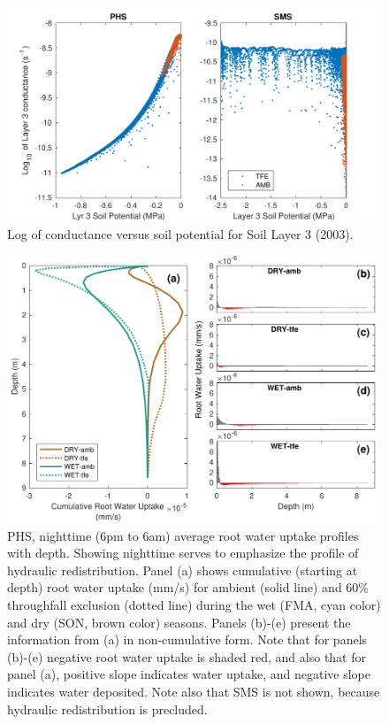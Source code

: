 \documentclass[draft,linenumbers]{agujournal}
\begin{document}
  \begin{figure}[h]
     \centering
     \includegraphics[width=30pc]{../figs2/suppfig2.pdf}
     \caption{Log of conductance versus soil potential for Soil Layer 3 (2003).}
     \label{supp:cond2}
  \end{figure}
  \clearpage

    \begin{figure}[h]
     \centering
     \includegraphics[width=30pc]{../figs2/fig10.pdf}
     \caption{PHS, nighttime (6pm to 6am) average root water uptake profiles with depth. 
     Showing nighttime serves to emphasize the profile of hydraulic redistribution.
     Panel (a) shows cumulative (starting at depth) root water uptake (mm/s) for ambient (solid line) and 60\% throughfall exclusion (dotted line)
     during the wet (FMA, cyan color) and dry (SON, brown color) seasons. 
     Panels (b)-(e) present the information from (a) in non-cumulative form. 
     Note that for panels (b)-(e) negative root water uptake is shaded red, and also that for panel (a), 
     positive slope indicates water uptake, and negative slope indicates water deposited.
     Note also that SMS is not shown, because hydraulic redistribution is precluded.}
     \label{supp:hr}
  \end{figure}
  \clearpage
  
\end{document}
